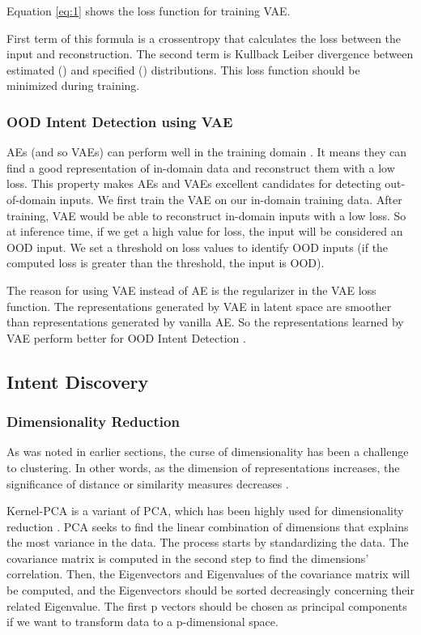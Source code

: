 \documentclass{article}
\begin{document}
Equation \ref{eq:1} shows the loss function for training VAE.
 

First term of this formula is a crossentropy that calculates the loss between the input and reconstruction.
The second term is Kullback Leiber divergence between estimated () and specified () distributions.
This loss function should be minimized during training.

\subsubsection{OOD Intent Detection using VAE}

AEs (and so VAEs) can perform well in the training domain \citep{noroozi2016unsupervised,NIPS2015_aa169b49}.
It means they can find a good representation of in-domain data and reconstruct them with a low loss.
This property makes AEs and VAEs excellent candidates for detecting out-of-domain inputs.
We first train the VAE on our in-domain training data.
After training, VAE would be able to reconstruct in-domain inputs with a low loss.
So at inference time, if we get a high value for loss, the input will be considered an OOD input.
We set a threshold on loss values to identify OOD inputs
(if the computed loss is greater than the threshold, the input is OOD).

The reason for using VAE instead of AE is the regularizer in the VAE loss function.
The representations generated by VAE in latent space are smoother than representations generated by vanilla AE.
So the representations learned by VAE perform better for OOD Intent Detection \citep{an2015variational}.

\subsection{Intent Discovery}

\subsubsection{Dimensionality Reduction}

As was noted in earlier sections, the curse of dimensionality has been a challenge to clustering. 
In other words, as the dimension of representations increases, the significance of distance or similarity measures decreases \citep{10.1007/3-540-44503-X_27}.

Kernel-PCA is a variant of PCA, which has been highly used for dimensionality reduction \citep{10.1007/BFb0020217}. 
PCA seeks to find the linear combination of dimensions that explains the most variance in the data. 
The process starts by standardizing the data. The covariance matrix is computed in the second step to find the dimensions' correlation. 
Then, the Eigenvectors and Eigenvalues of the covariance matrix will be computed, and the Eigenvectors should be sorted decreasingly concerning their related Eigenvalue. 
The first p vectors should be chosen as principal components if we want to transform data to a p-dimensional space.
\end{document}
